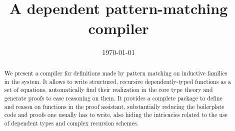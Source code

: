 \documentclass[a4paper]{llncs}
\author{\theauthor}
\date{\today}
\institute{\myaffiliation
  \\\email{\mymail}}
\title{\Equations\\
  A dependent pattern-matching compiler}
\begin{document}
\maketitle

\begin{abstract}
  We present a compiler for definitions made by pattern matching on
  inductive families in the \Coq system. It allows to write structured,
  recursive dependently-typed functions as a set of equations,
  automatically find their realization in the core type theory and
  generate proofs to ease reasoning on them.
  It provides a complete package to define 
  and reason on functions in the proof assistant, substantially
  reducing the boilerplate code and proofs one usually has to write, 
  also hiding the intricacies related to the use of dependent types and
  complex recursion schemes.
\end{abstract}







\end{document}
